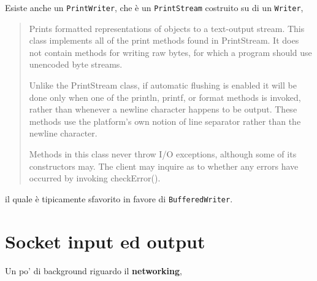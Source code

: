 \documentclass[\fontsizeclass,twocolumn]{\classname}
\theoremstyle{definition}
\theoremstyle{definition}
\begin{document}
Esiste anche un \texttt{PrintWriter}, che è un \texttt{PrintStream} costruito
su di un \texttt{Writer},

\begin{quote}
    \footnotesize{Prints formatted representations of objects to a text-output
        stream. This class implements all of the print methods found in
        PrintStream. It does not contain methods for writing raw bytes, for
        which a program should use unencoded byte streams.

Unlike the PrintStream class, if automatic flushing is enabled it will be done
only when one of the println, printf, or format methods is invoked, rather than
whenever a newline character happens to be output. These methods use the
platform's own notion of line separator rather than the newline character.

Methods in this class never throw I/O exceptions, although some of its
constructors may. The client may inquire as to whether any errors have occurred
by invoking checkError().
}
\end{quote}

il quale è tipicamente sfavorito in favore di \texttt{BufferedWriter}.

\chapter{Socket input ed output}

Un po' di background riguardo il \textbf{networking},
\end{document}
